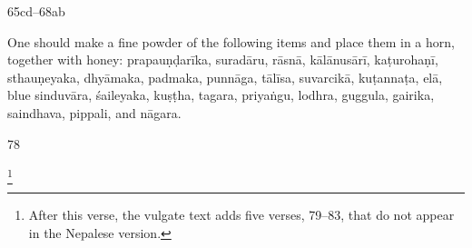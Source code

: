 \begin{translation}
\item [65cd--68ab]

One should make a fine powder of the following items and place them in a 
horn, together with honey: %
\gls{prapauṇḍarīka},
\gls{suradāru},
\gls{rāsnā},
\gls{kālānusārī},
\gls{kaṭurohaṇī},
\gls{sthauṇeyaka}, 
\gls{dhyāmaka},
\gls{padmaka}, 
\gls{punnāga},
\gls{tālīsa}, 
\gls{suvarcikā},
\gls{kuṭannaṭa}, 
\gls{elā},
blue \gls{sinduvāra}, 
\gls{śaileyaka},
\gls{kuṣṭha},
\gls{tagara},
\gls{priyaṅgu},
\gls{lodhra},
\gls{guggula}, 
\gls{gairika}, 
\gls{saindhava}, %
\gls{pippali}, 
and 
\gls{nāgara}.






    
    \strut
    \bigskip
    
       
     \item[78] 
     
     \footnote{After this verse, the vulgate text adds five
        verses, 79--83, that do not appear in the Nepalese version.}
\end{translation}    